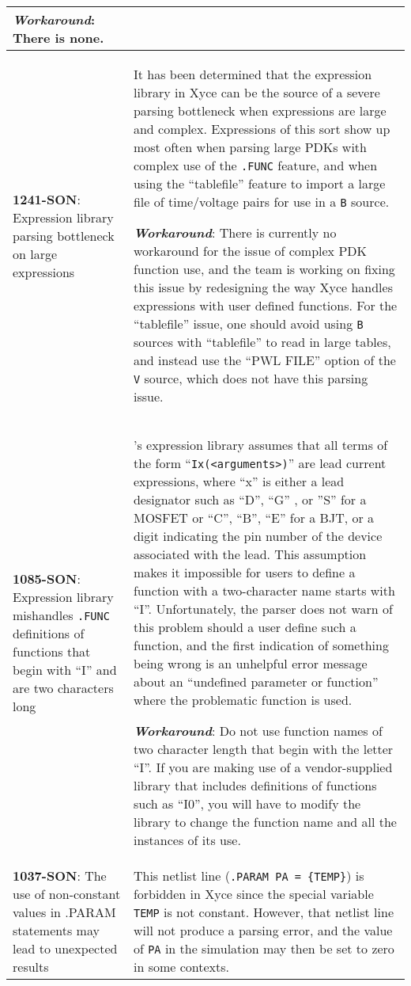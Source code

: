 {\begin{longtable}[h] {>{\raggedright\small}m{2in}|>{\raggedright\let\\\tabularnewline\small}m{3.5in}}
\textbf{\textit{Workaround}}:
There is none.
\\ \hline

\textbf{1241-SON}: Expression library parsing bottleneck on large expressions &
It has been determined that the expression library in Xyce can be the
source of a severe parsing bottleneck when expressions are large and
complex.  Expressions of this sort show up most often when parsing
large PDKs with complex use of the \texttt{.FUNC} feature, and when
using the ``tablefile'' feature to import a large file of time/voltage
pairs for use in a \texttt{B} source.

\textbf{\textit{Workaround}}:
There is currently no workaround for the issue of complex PDK function
use, and the team is working on fixing this issue by redesigning the
way Xyce handles expressions with user defined functions.  For the
``tablefile'' issue, one should avoid using \texttt{B} sources with
``tablefile'' to read in large tables, and instead use the ``PWL
FILE'' option of the \texttt{V} source, which does not have this
parsing issue.
\\ \hline

\textbf{1085-SON}: Expression library mishandles \texttt{.FUNC} definitions of functions that begin with ``I'' and are two characters long &
\Xyce{}'s expression library assumes that all terms of the form
``\texttt{Ix(<arguments>)}'' are lead current expressions, where ``x'' is
either a lead designator such as ``D'', ``G'' , or ''S'' for a MOSFET
or ``C'', ``B'', ``E'' for a BJT, or a digit indicating the pin number
of the device associated with the lead.  This assumption makes it
impossible for users to define a function with a two-character name
starts with ``I''.  Unfortunately, the parser does not warn of this
problem should a user define such a function, and the first indication
of something being wrong is an unhelpful error message about an
``undefined parameter or function'' where the problematic function is
used.

\textbf{\textit{Workaround}}: Do not use function names of two character
length that begin with the letter ``I''.  If you are making use of a
vendor-supplied library that includes definitions of functions such as
``I0'', you will have to modify the library to change the function
name and all the instances of its use.
\\ \hline

\textbf{1037-SON}: The use of non-constant values in .PARAM
statements may lead to unexpected results &  This netlist line
(\texttt{.PARAM PA = \{TEMP\}}) is forbidden in Xyce since
the special variable \texttt{TEMP} is not constant.  However,
that netlist line will not produce a \Xyce{} parsing error, and
the value of \texttt{PA} in the simulation may then be set to 
zero in some contexts.


\end{longtable}}
